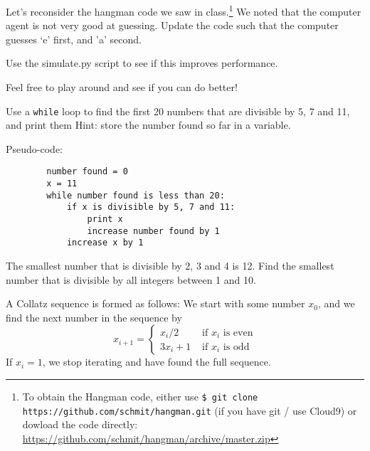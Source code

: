 \begin{questions}

\label{sub:hangman_1}

    Let's reconsider the hangman code we saw in class.\footnote{To obtain the Hangman code, either use \texttt{\$ git clone https://github.com/schmit/hangman.git} (if you have git / use Cloud9)
    or dowload the code directly: \url{https://github.com/schmit/hangman/archive/master.zip}}
    We noted that the computer agent is not very good at guessing.
    Update the code such that the computer guesses `e' first, and 'a' second.

    Use the simulate.py script to see if this improves performance.

    Feel free to play around and see if you can do better!

\label{sub:while_loop}

    Use a \texttt{while} loop to find the first 20 numbers that are divisible by 5, 7 and 11, and print them
    Hint: store the number found so far in a variable.

    Pseudo-code:

    \begin{verbatim}
        number found = 0
        x = 11
        while number found is less than 20:
            if x is divisible by 5, 7 and 11:
                print x
                increase number found by 1
            increase x by 1
    \end{verbatim}

\label{sub:more_while_loops}

    The smallest number that is divisible by 2, 3 and 4 is 12.
    Find the smallest number that is divisible by all integers between 1 and 10.


\label{sub:collatz_sequence}

A Collatz sequence is formed as follows:
We start with some number $x_0$, and we find the next number in the sequence by
\[
    x_{i+1} = \begin{cases}
        x_i / 2 & \text{ if $x_i$ is even}\\
        3x_i + 1 & \text{ if $x_i$ is odd}
    \end{cases}
\]
If $x_i = 1$, we stop iterating and have found the full sequence.


\end{questions}
